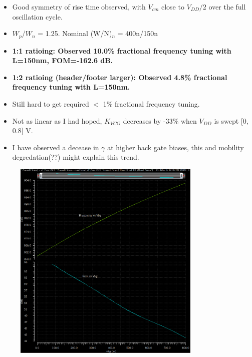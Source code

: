 			\begin{itemize}[itemsep=4pt,label=\protect---]
				\item Good symmetry of rise time observed, with $V_{cm}$ close to $V_{DD}/2$ over the full oscillation cycle.
				\item $W_p$/$W_n$ = 1.25. Nominal (W/N)$_n$ = 400n/150n
				\item \textbf{1:1 ratioing: Observed 10.0\% fractional frequency tuning with L=150nm, {\color{red}FOM=-162.6 dB.}}
				\item \textbf{1:2 ratioing (header/footer larger): Observed 4.8\% fractional frequency tuning with L=150nm.}
				\item Still hard to get required $<$ 1\% fractional frequency tuning.
			\end{itemize}




			\begin{itemize}[itemsep=4pt,label=\protect---]
				\item Not as linear as I had hoped, $K_{VCO}$ decreases by -33\% when $V_{DD}$ is swept [0, 0.8] V.
				\item I have observed a decease in $\gamma$ at higher back gate biases, this and mobility degredation(??) might explain this trend.
			\end{itemize}

			\begin{figure}[htb!]
			        \centering
			        \includegraphics[width=0.8\textwidth, angle=0]{./figs/telescopic_kcvo_vbg}
			\end{figure}


